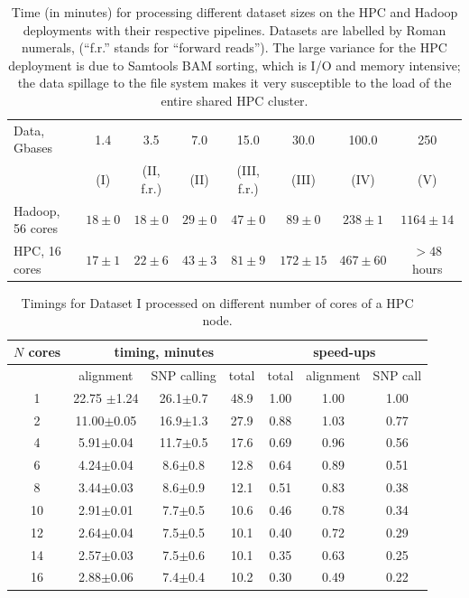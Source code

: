 \documentclass[10pt]{article}
\begin{document}
\begin{table}[!ht]
\small

\caption{%
	Time (in minutes) for processing different dataset sizes on the HPC and
	Hadoop deployments with their respective pipelines. Datasets are labelled by
	Roman numerals, (``f.r.'' stands for ``forward reads''). The large variance
	for the HPC deployment is due to Samtools BAM sorting, which is I/O and memory
	intensive; the data spillage to the file system makes it very susceptible to
	the load of the entire shared HPC cluster.
	}

\begin{center}
\begin{tabular}{l|c|c|c|c|c|c|c}

Data, Gbases		&	1.4	&	3.5		&	7.0		&	15.0		&	30.0		&	100.0	&	250 	\\
				&	(I)	&	(II, f.r.)	&	(II)		&	(III, f.r.)	&	(III)		&	(IV)		&	(V)\\
\hline
Hadoop, 56 cores		&	$18\pm0	$	&	$18\pm0	$	&	$29\pm0$	&	$47\pm0	$	&	$89\pm0$	&	$238\pm1$		&	$1164\pm14$\\
HPC, 16 cores	&	$17\pm1$	&	$22\pm6$	&	$43\pm3$	&	$81\pm9$	&	$172\pm15$		&	$467\pm60$	& $>48$ hours\\

\end{tabular}
\end{center}
\label{table:pipleline-timings}
\normalsize
\end{table}%




\begin{table}[!ht]
\small
\caption{Timings for Dataset I processed on different number of cores of a HPC node.}
\begin{center}
\begin{tabular}{c|c|c|c|ccc}
$N$ cores	&\multicolumn{3}{c|}{timing, minutes}&\multicolumn{3}{c}{speed-ups} \\
\hline
	& alignment 	&	SNP calling	&	total  &total & alignment& SNP call\\
\hline
1	&	22.75	$\pm$1.24&	26.1$\pm$0.7	&	48.9	&	 1.00	&	1.00	&	1.00\\
2	&	11.00$\pm$0.05	&	16.9$\pm$1.3	&	27.9	&	 0.88	&	1.03	&	0.77\\
4	&	5.91$\pm$0.04	&	11.7$\pm$0.5	&	17.6	&	 0.69	&	0.96	&	0.56\\
6	&	4.24$\pm$0.04	&	8.6$\pm$0.8	&	12.8	&	 0.64	&	0.89	&	0.51\\
8	&	3.44$\pm$0.03	&	8.6$\pm$0.9	&	12.1	&	 0.51	&	0.83	&	0.38\\
10	&	2.91$\pm$0.01	&	7.7$\pm$0.5	&	10.6	&	 0.46	&	0.78	&	0.34\\
12	&	2.64$\pm$0.04	&	7.5$\pm$0.5	&	10.1	&	 0.40	&	0.72	&	0.29\\
14	&	2.57$\pm$0.03	&	7.5$\pm$0.6	&	10.1	&	 0.35	&	0.63	&	0.25\\
16	&	2.88$\pm$0.06	&	7.4$\pm$0.4	&	10.2	&	 0.30	&	0.49	&	0.22\\
\end{tabular}
\end{center}
\label{table:timings-hpc}
\normalsize
\end{table}
\end{document}
